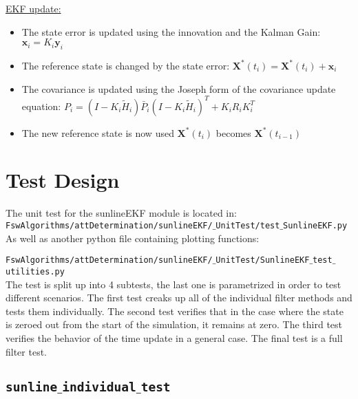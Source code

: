 \documentclass[]{BasiliskReportMemo}
\begin{document}
 \underline{EKF update:}

\begin{itemize}
\item The state error is updated using the innovation and the Kalman Gain: $\bm x_i =   K_i\bm y_i $
\item The reference state is changed by the state error: $\bm X^*(t_i) =  \bm X^*(t_i) + \bm x_i $
\item The covariance is updated using the Joseph form of the covariance update equation:
$P_i = \left( I - K_i \tilde{H}_i\right) \bar{P}_{i} \left( I - K_i \tilde{H}_i\right)^T + K_i R_i K_i^T$
\item The new reference state is now used $\bm X^*(t_i)$ becomes $\bm X^*(t_{i-1})$
\end{itemize}

 


\section{Test Design}
The unit test for the sunlineEKF module is located in:\\

\noindent
{\tt FswAlgorithms/attDetermination/sunlineEKF/$\_$UnitTest/test$\_$SunlineEKF.py} \\

As well as another python file containing plotting functions:

\noindent
{\tt FswAlgorithms/attDetermination/sunlineEKF/$\_$UnitTest/SunlineEKF$\_$test$\_$utilities.py} \\

The test is split up into 4 subtests, the last one is parametrized in order to test different scenarios. The first test creaks up all of the individual filter methods and tests them individually. The second test verifies that in the case where the state is zeroed out from the start of the simulation, it remains at zero. The third test verifies the behavior of the time update in a general case. The final test is a full filter test.

\subsection{\texttt{sunline$\_$individual$\_$test}}
\end{document}
